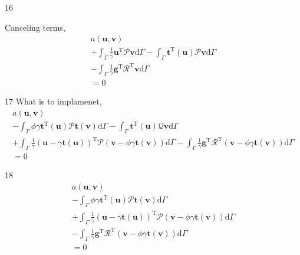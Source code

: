\documentclass[a4paper,12pt]{article}
\begin{document}
16

Canceling terms,
\begin{equation}
\begin{split}
a(\mathbf{u},\mathbf{v})
\\+
\int_\Gamma
\frac{1}{\gamma}
\mathbf{u}^\textrm{T}
\mathcal{P}\mathbf{v}
\textrm{d}\Gamma
-
\int_\Gamma
\mathbf{t}^\textrm{T}(\mathbf{u})
\mathcal{P}\mathbf{v}
\textrm{d}\Gamma
\\-
\int_\Gamma
\frac{1}{\gamma}
\mathbf{g}^\textrm{T}\mathcal{R}^\textrm{T}
\mathbf{v}
\textrm{d}\Gamma
\\=
0
\end{split}
\end{equation}

17
What is to implamenet,
\begin{equation}
\begin{split}
a(\mathbf{u},\mathbf{v})
\\-
\int_\Gamma
\phi\gamma
\mathbf{t}^{\textrm{T}}(\mathbf{u})
\mathcal{P}\mathbf{t}(\mathbf{v})
\textrm{d}\Gamma
-
\int_\Gamma
\mathbf{t}^{\textrm{T}}(\mathbf{u})
\mathcal{Q}\mathbf{v}
\textrm{d}\Gamma
\\+
\int_\Gamma
\frac{1}{\gamma}
(
\mathbf{u}-\gamma\mathbf{t}(\mathbf{u})
)^\textrm{T}\mathcal{P}
(\mathbf{v}-\phi\gamma\mathbf{t}(\mathbf{v}))
\textrm{d}\Gamma
-
\int_\Gamma
\frac{1}{\gamma}
\mathbf{g}^\textrm{T}\mathcal{R}^\textrm{T}
(\mathbf{v}-\phi\gamma\mathbf{t}(\mathbf{v}))
\textrm{d}\Gamma
\\=
0
\end{split}
\end{equation}

18
\begin{equation}
\begin{split}
a(\mathbf{u},\mathbf{v})
\\-
\int_\Gamma
\phi\gamma
\mathbf{t}^{\textrm{T}}(\mathbf{u})
\mathcal{P}\mathbf{t}(\mathbf{v})
\textrm{d}\Gamma
\\+
\int_\Gamma
\frac{1}{\gamma}
(
\mathbf{u}-\gamma\mathbf{t}(\mathbf{u})
)^\textrm{T}\mathcal{P}
(\mathbf{v}-\phi\gamma\mathbf{t}(\mathbf{v}))
\textrm{d}\Gamma
\\-
\int_\Gamma
\frac{1}{\gamma}
\mathbf{g}^\textrm{T}\mathcal{R}^\textrm{T}
(\mathbf{v}-\phi\gamma\mathbf{t}(\mathbf{v}))
\textrm{d}\Gamma
\\=
0
\end{split}
\end{equation}
\end{document}
